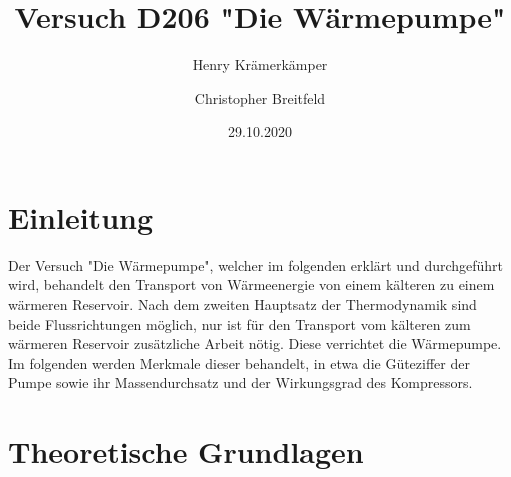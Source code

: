 \documentclass{scrartcl} %
\begin{document}
\title{Versuch D206 "Die Wärmepumpe"}
\author{Henry Krämerkämper \and Christopher Breitfeld}
\date{29.10.2020}
\maketitle
\newpage
\tableofcontents
\newpage
\section{Einleitung}
Der Versuch "Die Wärmepumpe", welcher im folgenden erklärt und durchgeführt wird, behandelt den Transport von
Wärmeenergie von einem kälteren zu einem wärmeren Reservoir. Nach dem zweiten Hauptsatz der Thermodynamik sind beide
Flussrichtungen möglich, nur ist für den Transport vom kälteren zum wärmeren Reservoir zusätzliche Arbeit nötig. Diese verrichtet die Wärmepumpe.
Im folgenden werden Merkmale dieser behandelt, in etwa die Güteziffer der Pumpe sowie ihr Massendurchsatz und der Wirkungsgrad des Kompressors.
\section{Theoretische Grundlagen}
\end{document}
